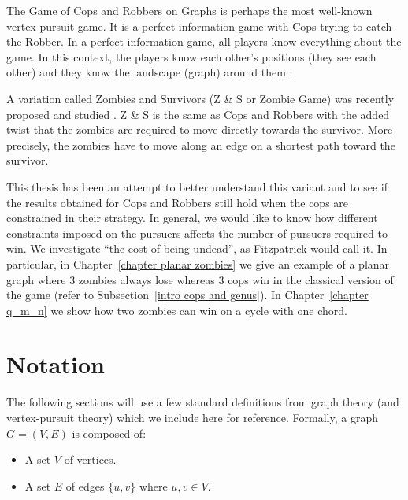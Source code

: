 The Game of Cops and Robbers on Graphs \cite{bonato2011game} is perhaps the most
well-known vertex pursuit game. It is a perfect information game with Cops trying
to catch the Robber. In a perfect information game, all players know everything about the game.
In this context, the players know each other's positions (they see each other) and they
know the landscape (graph) around them \cite{schaefer1978complexity}.

A variation called Zombies and Survivors (Z \& S or Zombie Game) was recently proposed and studied  \cite{fitzpatrick2016deterministic, fitzpatrick2018game}.
Z \& S is the same as Cops and Robbers with the added twist that the zombies are required to move directly towards the survivor. More precisely, the zombies have to move along an edge
on a shortest path toward the survivor.

This thesis has been an attempt to better understand this variant and
to see if the results obtained for Cops and Robbers still hold when the cops
are constrained in their strategy. In general, we would like to know how different constraints imposed on the pursuers affects the number of pursuers required to win. We investigate ``the cost of being undead'', as Fitzpatrick \cite{fitzpatrick2016deterministic} would call it.
In particular, in Chapter~\ref{chapter planar zombies}
we give an example of a planar graph where 3 zombies always lose whereas 3 cops win in the classical version of the game (refer to Subsection~\ref{intro cops and genus}).
In Chapter~\ref{chapter q_m_n} we show how two zombies can win on a cycle with one chord.

\section{Notation}

The following sections will use a few standard definitions from graph theory (and vertex-pursuit theory) which we include here for reference.
Formally, a graph $G = (V, E)$ is composed of:

\begin{itemize}
\item A set $V$ of vertices.
\item A set $E$ of edges $\{u,v\}$ where $u, v \in V$.
\end{itemize}


